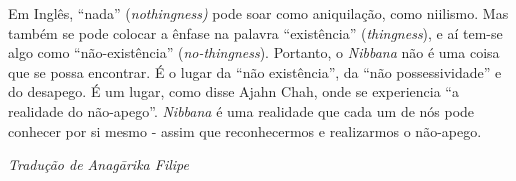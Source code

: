Em Inglês, ``nada'' (\emph{nothingness)} pode soar como aniquilação,
como niilismo. Mas também se pode colocar a ênfase na palavra
``existência'' (\emph{thingness}), e aí tem-se algo como
``não-existência'' (\emph{no-thingness}). Portanto, o \emph{Nibbana} não
é uma coisa que se possa encontrar. É o lugar da ``não existência'', da
``não possessividade'' e do desapego. É um lugar, como disse Ajahn Chah,
onde se experiencia ``a realidade do não-apego''. \emph{Nibbana} é uma
realidade que cada um de nós pode conhecer por si mesmo - assim que
reconhecermos e realizarmos o não-apego.


\bigskip

{\raggedleft\itshape
  Tradução de Anagārika Filipe
\par}
